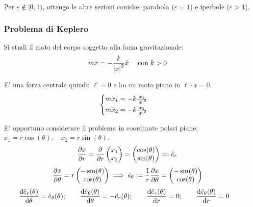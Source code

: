 \begin{remark}
    Per $\varepsilon \notin [0,1)$, ottengo le altre sezioni coniche: parabola ($\varepsilon=1$) e iperbole ($\varepsilon>1$).
\end{remark}


\subsubsection{Problema di Keplero}
Si studi il moto del corpo soggetto alla forza gravitazionale:
\begin{equation}
    m\ddot{x}=-\frac{k}{\abs{x}^2}\hat{x} \quad \text{ con } k>0
\end{equation}

E' una forza centrale quindi: $\dot{\ell}=0$ e ho un moto piano in $\ell\cdot x=0$.
\begin{equation}
    \begin{cases}
        m\ddot{x}_1= -k\frac{x_1}{\abs{x}^3}\\
        m\ddot{x}_2= -k\frac{x_2}{\abs{x}^3}
    \end{cases}
\end{equation}

E' opportuno considerare il problema in coordinate polari piane: $x_1= r\cos(\theta), \quad x_2=r\sin(\theta)$. 
\begin{equation}
    \pdv{x}{r}= \pdv{}{r}\begin{pmatrix}
        x_1\\x_2
    \end{pmatrix}=\begin{pmatrix}
        \cos(\theta)\\\sin(\theta)
    \end{pmatrix}=:\hat{e}_r 
\end{equation}
\begin{equation}
    \pdv{x}{\theta}= r \begin{pmatrix}
        -\sin(\theta)\\\cos(\theta)
    \end{pmatrix}\implies 
    \hat{e}_\theta:=\frac{1}{r}\pdv{x}{\theta}= \begin{pmatrix}
        -\sin(\theta)\\\cos(\theta)
    \end{pmatrix}
\end{equation}
\begin{equation}
    \dv{\hat{e}_r(\theta)}{\theta} = \hat{e}_\theta(\theta) ; \qquad
    \dv{\hat{e}_\theta(\theta)}{\theta} = -\hat{e}_r(\theta) ; \qquad
    \dv{\hat{e}_r(\theta)}{r} = 0 ; \qquad
    \dv{\hat{e}_\theta(\theta)}{r} = 0\quad
\end{equation}

